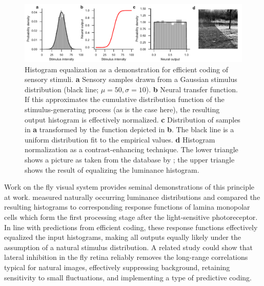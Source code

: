 \begin{figure}
    \centering
    \includegraphics[width=1\textwidth]{graphics/figure_equalization}
    \caption[Histogram equalization]
    {Histogram equalization as a demonstration for efficient coding of sensory stimuli. \textbf{a} Sensory samples drawn from a Gaussian stimulus distribution (black line; $\mu = 50, \sigma = 10$). \textbf{b} Neural transfer function. If this approximates the cumulative distribution function of the stimulus-generating process (as is the case here), the resulting output histogram is effectively normalized. \textbf{c} Distribution of samples in \textbf{a} transformed by the function depicted in \textbf{b}. The black line is a uniform distribution fit to the empirical values. \textbf{d} Histogram normalization as a contrast-enhancing technique. The lower triangle shows a picture as taken from the database by \citet{vanHateren:1998jt}; the upper triangle shows the result of equalizing the luminance histogram.}
    \label{fig:equalization}
\end{figure}

Work on the fly visual system provides seminal demonstrations of this principle at work. \citet{Laughlin:1981wn} measured naturally occurring luminance distributions and compared the resulting histograms to corresponding response functions of lamina monopolar cells which form the first processing stage after the light-sensitive photoreceptor. In line with predictions from efficient coding, these response functions effectively equalized the input histograms, making all outputs equally likely under the assumption of a natural stimulus distribution. A related study \citep{Srinivasan:1982uq} could show that lateral inhibition in the fly retina reliably removes the long-range correlations typical for natural images, effectively suppressing background, retaining sensitivity to small fluctuations, and implementing a type of predictive coding.


